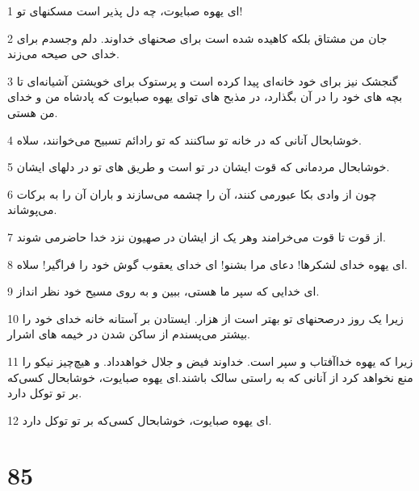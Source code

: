\par 1 ای یهوه صبایوت، چه دل پذیر است مسکنهای تو!
\par 2 جان من مشتاق بلکه کاهیده شده است برای صحنهای خداوند. دلم وجسدم برای خدای حی صیحه می‌زند.
\par 3 گنجشک نیز برای خود خانه‌ای پیدا کرده است و پرستوک برای خویشتن آشیانه‌ای تا بچه های خود را در آن بگذارد، در مذبح های تو‌ای یهوه صبایوت که پادشاه من و خدای من هستی.
\par 4 خوشابحال آنانی که در خانه تو ساکنند که تو رادائم تسبیح می‌خوانند، سلاه.
\par 5 خوشابحال مردمانی که قوت ایشان در تو است و طریق های تو در دلهای ایشان.
\par 6 چون از وادی بکا عبورمی کنند، آن را چشمه می‌سازند و باران آن را به برکات می‌پوشاند.
\par 7 از قوت تا قوت می‌خرامند وهر یک از ایشان در صهیون نزد خدا حاضرمی شوند.
\par 8 ‌ای یهوه خدای لشکرها! دعای مرا بشنو! ای خدای یعقوب گوش خود را فراگیر! سلاه.
\par 9 ‌ای خدایی که سپر ما هستی، ببین و به روی مسیح خود نظر انداز.
\par 10 زیرا یک روز درصحنهای تو بهتر است از هزار. ایستادن بر آستانه خانه خدای خود را بیشتر می‌پسندم از ساکن شدن در خیمه های اشرار.
\par 11 زیرا که یهوه خداآفتاب و سپر است. خداوند فیض و جلال خواهدداد. و هیچ‌چیز نیکو را منع نخواهد کرد از آنانی که به راستی سالک باشند.‌ای یهوه صبایوت، خوشابحال کسی‌که بر تو توکل دارد.
\par 12 ‌ای یهوه صبایوت، خوشابحال کسی‌که بر تو توکل دارد.
 
\chapter{85}

